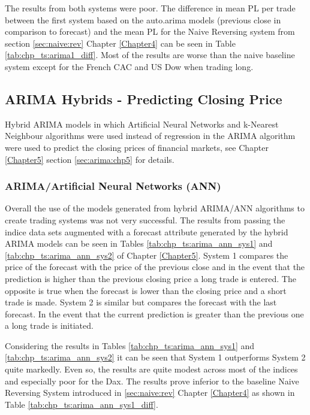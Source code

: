 The results from both systems were poor. The difference in mean PL per trade between the first system based on the auto.arima models (previous close in comparison to forecast) and the mean PL for the Naive Reversing system from section \ref{sec:naive:rev} Chapter \ref{Chapter4} can be seen in Table \ref{tab:chp_ts:arima1_diff}. Most of the results are worse than the naive baseline system except for the French CAC and US Dow when trading long.



\subsection{ARIMA Hybrids - Predicting Closing Price}
Hybrid ARIMA models in which Artificial Neural Networks and k-Nearest Neighbour algorithms were used instead of regression in the ARIMA algorithm were used to predict the closing prices of financial markets, see Chapter \ref{Chapter5} section \ref{sec:arima:chp5} for details.

\subsubsection{ARIMA/Artificial Neural Networks (ANN)}
Overall the use of the models generated from hybrid ARIMA/ANN algorithms to create trading systems was not very successful. The results from passing the indice data sets augmented with a forecast attribute generated by the hybrid ARIMA models can be seen in Tables  \ref{tab:chp_ts:arima_ann_sys1} and \ref{tab:chp_ts:arima_ann_sys2} of Chapter \ref{Chapter5}. System 1 compares the price of the forecast with the price of the previous close and in the event that the prediction is higher than the previous closing price a long trade is entered. The opposite is true when the forecast is lower than the closing price and a short trade is made. System 2 is similar but compares the forecast with the last forecast. In the event that the current prediction is greater than the previous one a long trade is initiated.

Considering the results in Tables \ref{tab:chp_ts:arima_ann_sys1} and \ref{tab:chp_ts:arima_ann_sys2} it can be seen that System 1 outperforms System 2 quite markedly. Even so, the results are quite modest across most of the indices and especially poor for the Dax. The results prove inferior to the baseline Naive Reversing System introduced in \ref{sec:naive:rev} Chapter \ref{Chapter4} as shown in Table \ref{tab:chp_ts:arima_ann_sys1_diff}.

